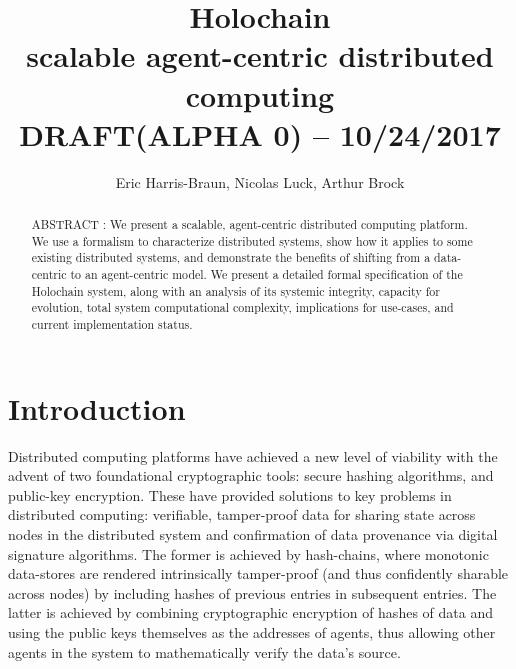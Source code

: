\documentclass[twocolumn,showpacs,%
  nofootinbib,aps,superscriptaddress,%
  eqsecnum,prd,notitlepage,showkeys,10pt]{revtex4-1}
\begin{document}
\newcommand\todo[1]{\textcolor{red}{#1}}
\newcommand\term[1]{\textbf{\textit{#1}}}
\newcommand{\sbtc}{$\Omega_{\text{bitcoin}}$}
\newcommand{\sgit}{$\Omega_{\text{git}}$}
\newcommand{\shc}{$\Omega_{\text{hc}}$}
\newcommand{\hcdna}{$\text{DNA}$}
\newcommand{\hcid}{\iota}
\newcommand{\dhtget}{\texttt{get}}
\newcommand{\dhtput}{\texttt{put}}
\newcommand{\dhtstate}{\Delta}
\newcommand{\dhtfns}{F_\mathrm{DHT}}
\newcommand{\sysfns}{F_\mathrm{sys}}
\newcommand{\appfns}{F_\mathrm{app}}
\newcommand{\hcdht}{DHT_\text{hc}}
\newcommand{\chain}{\mathcal{X}}
\newcommand{\eqbang}{\stackrel{!}{=}}

\title{Holochain \\
\small scalable agent-centric distributed computing\\DRAFT(ALPHA 0) -- 10/24/2017}

\author{Eric Harris-Braun, Nicolas Luck, Arthur Brock}


\begin{abstract}
ABSTRACT : We present a scalable, agent-centric distributed computing platform.  We use a  formalism to characterize distributed systems, show how it applies to some existing distributed systems, and demonstrate the benefits of shifting from a data-centric to an agent-centric model. We present a detailed formal specification of the Holochain system, along with an analysis of its systemic integrity, capacity for evolution, total system computational complexity, implications for use-cases, and current implementation status.

\end{abstract}

\maketitle

\section{Introduction}
\label{sec:intro}

Distributed computing platforms have achieved a new level of viability with the advent of two foundational cryptographic tools: secure hashing algorithms, and public-key encryption.  These have provided solutions to key problems in distributed computing: verifiable, tamper-proof data for sharing state across nodes in the distributed system and confirmation of data provenance via digital signature algorithms.  The former is achieved by hash-chains, where monotonic data-stores are rendered intrinsically tamper-proof (and thus confidently sharable across nodes) by including hashes of previous entries in subsequent entries.  The latter is achieved by combining cryptographic encryption of hashes of data and using the public keys themselves as the addresses of agents, thus allowing other agents in the system to mathematically verify the data's source.
\end{document}
